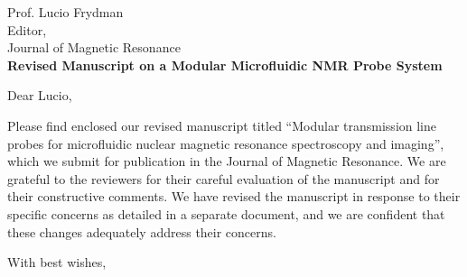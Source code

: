 \documentclass{mu-soton-letter}
\begin{document}
\begin{letter}{Prof. Lucio Frydman\\
  Editor,\\
  Journal of Magnetic Resonance\\[2cm]
  \textbf{Revised Manuscript on a Modular Microfluidic NMR Probe System}}
\vfill
\opening{Dear Lucio,
}
Please find enclosed our revised manuscript titled
``Modular transmission line probes for microfluidic nuclear
magnetic resonance spectroscopy and imaging'', which we submit for publication
in the Journal of Magnetic Resonance.
We are grateful to the reviewers for their careful evaluation of the manuscript
and for their constructive comments. We have revised the manuscript
in response to their specific concerns
as detailed in a separate document, and
we are confident that these changes adequately address their concerns.


\closing{With best wishes,}

\end{letter}
\end{document}
